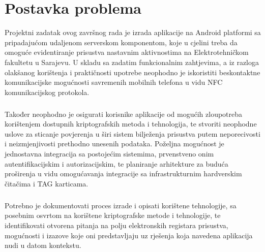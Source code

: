 \chapter{Postavka problema}
Projektni zadatak ovog završnog rada je izrada aplikacije na Android platformi sa pripadajućom udaljenom serverskom komponentom, koje u cjelini treba da omoguće evidentiranje prisustva nastavnim aktivnostima na Elektrotehničkom fakultetu u Sarajevu. U skladu sa zadatim funkcionalnim zahtjevima, a iz razloga olakšanog korištenja i praktičnosti upotrebe neophodno je iskoristiti beskontaktne komunikacijske mogućnosti savremenih mobilnih telefona u vidu NFC komunikacijskog protokola.
\paragraph*{}
Također neophodno je osigurati korisnike aplikacije od mogućih zloupotreba korištenjem dostupnih kriptografskih metoda i tehnologija, te stvoriti neophodne uslove za sticanje povjerenja u širi sistem bilježenja prisustva putem neporecivosti i neizmjenjivosti prethodno unesenih podataka. Poželjna mogućnost je jednostavna integracija sa postojećim sistemima, prvenstveno onim autentifikacijskim i autorizacijskim, te planiranje arhitekture za buduća proširenja u vidu omogućavanja integracije sa infrastrukturnim hardverskim čitačima i TAG karticama.
\paragraph*{}
Potrebno je dokumentovati proces izrade i opisati korištene tehnologije, sa posebnim osvrtom na korištene kriptografske metode i tehnologije, te identifikovati otvorena pitanja na polju elektronskih registara prisustva, mogućnosti i izazove koje oni predstavljaju uz rješenja koja navedena aplikacija nudi u datom kontekstu.